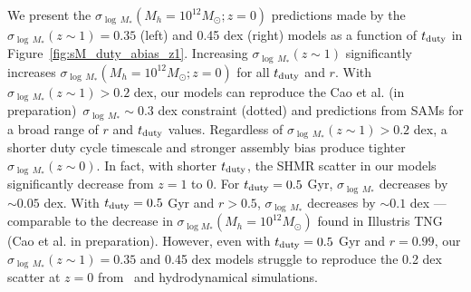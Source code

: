 \documentclass[12pt, letterpaper, preprint, tighten]{aastex62}
\newcommand{\edt}[1]{{\color{dred}{\bf} #1}}
\newcommand{\cao}{Cao et al. (in preparation)}
\newcommand{\tduty}{t_{\rm duty}}
\newcommand{\siglogm}{\sigma_{\log M_*}}
\begin{document}
\edt{
We present the $\sigma_{\log\,M_*}(M_h=10^{12}M_\odot; z=0)$ predictions made by 
the $\sigma_{\log\,M_*}(z\sim1) = 0.35$ (left) and 0.45 dex (right) models as a 
function of $\tduty$ in Figure~\ref{fig:sM_duty_abias_z1}. Increasing 
$\sigma_{\log\,M_*}(z\sim1)$ significantly increases $\sigma_{\log\,M_*}(M_h=10^{12}M_\odot; z=0)$ 
for all $\tduty$ and $r$. With $\sigma_{\log\,M_*}(z\sim1) > 0.2$ dex, our models 
can reproduce the \cao~$\sigma_{\log\,M_*}\sim 0.3$ dex constraint (dotted) and 
predictions from SAMs for a broad range of $r$ and $\tduty$ values. Regardless of 
$\sigma_{\log\,M_*}(z\sim1) > 0.2$ dex, a shorter duty cycle timescale and stronger
assembly bias produce tighter $\sigma_{\log\,M_*}(z\sim0)$. In fact, with shorter 
$\tduty$, the SHMR scatter in our models significantly decrease from $z=1$ to 0. 
For $\tduty=0.5$ Gyr, $\sigma_{\log\,M_*}$ 
decreases by $\sim0.05$ dex. With $\tduty=0.5$ Gyr and $r > 0.5$, $\sigma_{\log\,M_*}$ 
decreases by $\sim0.1$ dex --- comparable to the decrease in $\siglogm(M_h=10^{12}M_\odot)$
found in Illustris TNG (Cao et al. in preparation). However, even with 
$\tduty = 0.5$ Gyr and $r=0.99$, our $\sigma_{\log\,M_*}(z\sim1) = 0.35$ and 0.45 dex
models struggle to reproduce the 0.2 dex scatter at $z=0$ from~\cite{more2011, leauthaud2012, reddick2013, tinker2013, zu2015} 
and hydrodynamical simulations.
}
\end{document}

